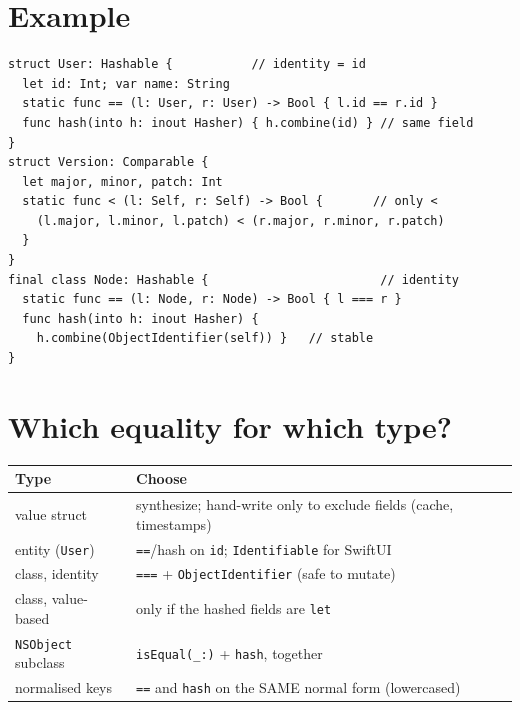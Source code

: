 \documentclass[8pt]{extarticle}
\newcommand\EQ{\hbox{=}\hbox{=}}
\newcommand\EQQ{\hbox{=}\hbox{=}\hbox{=}}
\begin{document}
\begin{multicols}{2}
\section{Example}
\begin{lstlisting}[language=SwiftSheet]
struct User: Hashable {           // identity = id
  let id: Int; var name: String
  static func == (l: User, r: User) -> Bool { l.id == r.id }
  func hash(into h: inout Hasher) { h.combine(id) } // same field
}
struct Version: Comparable {
  let major, minor, patch: Int
  static func < (l: Self, r: Self) -> Bool {       // only <
    (l.major, l.minor, l.patch) < (r.major, r.minor, r.patch)
  }
}
final class Node: Hashable {                        // identity
  static func == (l: Node, r: Node) -> Bool { l === r }
  func hash(into h: inout Hasher) {
    h.combine(ObjectIdentifier(self)) }   // stable
}
\end{lstlisting}

\columnbreak

\section{Which equality for which type?}
{\footnotesize
\begin{tabular}{@{}L{22mm}L{52mm}@{}}
\toprule
\textbf{Type} & \textbf{Choose} \\
\midrule
value struct & synthesize; hand-write only to exclude fields (cache, timestamps) \\
entity (\texttt{User}) & \texttt{\EQ}/hash on \texttt{id}; \texttt{Identifiable} for SwiftUI \\
class, identity & \texttt{\EQQ} + \texttt{ObjectIdentifier} (safe to mutate) \\
class, value-based & only if the hashed fields are \texttt{let} \\
\texttt{NSObject} subclass & \texttt{isEqual(\_:)} + \texttt{hash}, together \\
normalised keys & \texttt{\EQ} and \texttt{hash} on the SAME normal form (lowercased) \\
\bottomrule
\end{tabular}}


\end{multicols}
\end{document}
